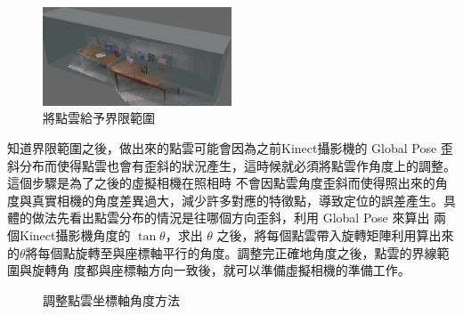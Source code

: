 
\begin{figure}
\begin{center}
  \includegraphics[width=0.5\textwidth]{figures/Bounding_Box.jpg}
  \caption{將點雲給予界限範圍}
  \label{fig:Bounding Box}
\end{center}
\end{figure}   
    
    知道界限範圍之後，做出來的點雲可能會因為之前Kinect攝影機的 Global Pose 歪斜分布而使得點雲也會有歪斜的狀況產生，這時候就必須將點雲作角度上的調整。這個步驟是為了之後的虛擬相機在照相時
    不會因點雲角度歪斜而使得照出來的角度與真實相機的角度差異過大，減少許多對應的特徵點，導致定位的誤差產生。具體的做法先看出點雲分布的情況是往哪個方向歪斜，利用 Global Pose 來算出
    兩個Kinect攝影機角度的 $\tan \theta$，求出 $\theta$ 之後，將每個點雲帶入旋轉矩陣利用算出來的$\theta$將每個點旋轉至與座標軸平行的角度。調整完正確地角度之後，點雲的界線範圍與旋轉角
    度都與座標軸方向一致後，就可以準備虛擬相機的準備工作。

    
    
\begin{figure}
  \begin{center}
  \end{center}
  \caption{調整點雲坐標軸角度方法 }
  \label{fig:rotate axis}
\end{figure}
    
